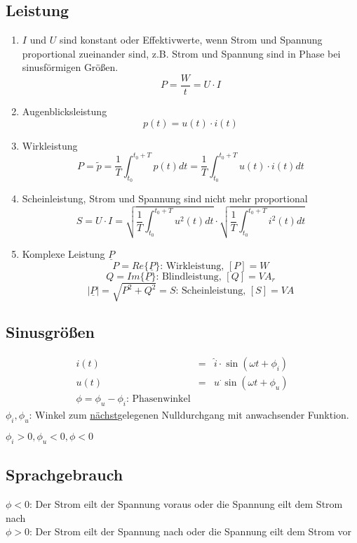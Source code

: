 \documentclass[german]{article}
\begin{document}


\subsection{Leistung}
\begin{enumerate}
	\item $I$ und $U$ sind konstant oder Effektivwerte, wenn Strom und Spannung proportional zueinander sind, z.B. Strom und Spannung sind in Phase bei sinusförmigen Größen.
		\[ P = \frac{W}{t} = U \cdot I \]
	\item Augenblicksleistung
		\[ p(t) = u(t) \cdot i(t) \]
	\item Wirkleistung
		\[ P = \tilde{p} = \frac1T \int_{t_0}^{t_0 + T} p(t) dt = \frac1T \int_{t_0}^{t_0 + T} u(t) \cdot i(t) dt \]
	\item Scheinleistung, Strom und Spannung sind nicht mehr proportional
		\[ S = U \cdot I = \sqrt{\frac1T \int_{t_0}^{t_0 + T} u^2 (t) dt} \cdot \sqrt{\frac1T \int_{t_0}^{t_0 + T} i^2 (t) dt} \]
	\item Komplexe Leistung $\underline P$
		\[ P = Re\{\underline P\} \text{: Wirkleistung, } [P] = W \]
		\[ Q = Im\{\underline P\} \text{: Blindleistung, } [Q] = VA_r \]
		\[ |\underline P| = \sqrt{P^2 + Q^2} = S \text{: Scheinleistung, } [S] = VA \]
\end{enumerate}

\subsection{Sinusgrößen}

\begin{eqnarray*}
	i(t) & = & \hat{i} \cdot \sin(\omega t + \phi_i) \\
	u(t) & = & u^ \cdot \sin(\omega t + \phi_u) \\
	\phi = \phi_u - \phi_i \text{: Phasenwinkel}
\end{eqnarray*}
$\phi_i, \phi_u$: Winkel zum \underline{nächst}gelegenen Nulldurchgang mit anwachsender Funktion.

$\phi_i > 0, \phi_u < 0, \phi < 0$

\subsection{Sprachgebrauch}
$\phi < 0$: Der Strom eilt der Spannung voraus oder die Spannung eilt dem Strom nach \\
$\phi > 0$: Der Strom eilt der Spannung nach oder die Spannung eilt dem Strom vor
\end{document}
